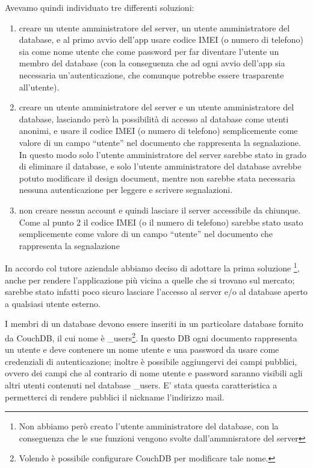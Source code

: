 		\noindent Avevamo quindi individuato tre differenti soluzioni:
		\begin{enumerate} 
			\item creare un utente amministratore del server, un utente amministratore 
				del database, e al primo avvio dell'app usare codice IMEI (o numero di telefono) 
				sia come nome utente che come password per far diventare l'utente un 
				membro del database (con la conseguenza che ad ogni avvio dell'app 
				sia necessaria un'autenticazione, che comunque potrebbe essere 
				trasparente all'utente).
			\item creare un utente amministratore del server e un utente amministratore 
				del database, lasciando però la possibilità di accesso al database 
				come utenti anonimi, e usare il codice IMEI (o numero di telefono) 
				semplicemente come valore di un campo ``utente'' nel documento che 
				rappresenta la segnalazione. In questo modo solo l'utente amministratore 
				del server sarebbe stato in grado di eliminare il database, e solo 
				l'utente amministratore del database avrebbe potuto modificare il 
				design document, mentre non sarebbe stata necessaria nessuna 
				autenticazione per leggere e scrivere segnalazioni.
			\item non creare nessun account e quindi lasciare il server accessibile 
				da chiunque. Come al punto 2 il codice IMEI (o il numero di telefono) 
				sarebbe stato usato semplicemente come valore di un campo ``utente''
				nel documento che rappresenta la segnalazione
		\end{enumerate}
		In accordo col tutore aziendale abbiamo deciso di adottare la prima soluzione
		\footnote{Non abbiamo però creato l'utente amministratore del database, con 
		la conseguenza che le sue funzioni vengono svolte dall'ammnisratore del server}, 
		anche per rendere l'applicazione più vicina a quelle che si trovano sul 
		mercato; sarebbe stato infatti poco sicuro lasciare l'accesso al server 
		e/o al database aperto a qualsiasi utente esterno.
		
		I membri di un database devono essere inseriti in un particolare database 
		fornito da CouchDB, il cui nome è \_users\footnote{Volendo è possibile 
		configurare CouchDB per modificare tale nome.}. In questo DB ogni documento 
		rappresenta un utente e deve contenere un nome utente e una password da 
		usare come credenziali di autenticazione; inoltre è possibile aggiungervi 
		dei campi pubblici, ovvero dei campi che al contrario di nome utente e 
		password saranno visibili agli altri utenti contenuti nel database \_users.
		E' stata questa caratteristica a permetterci di rendere pubblici il nickname 
		l'indirizzo mail.
		
